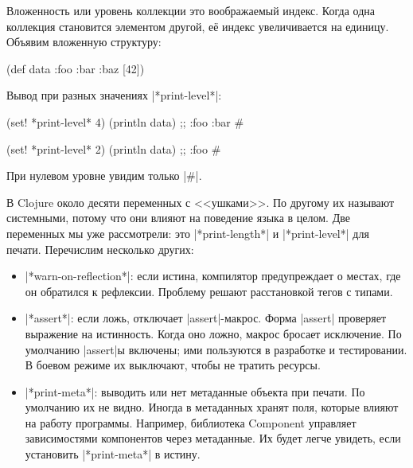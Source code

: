 Вложенность или уровень коллекции это воображаемый индекс. Когда одна коллекция
становится элементом другой, е\"{е} индекс увеличивается на единицу. Объявим
вложенную структуру:

\begin{english}
  \begin{clojure}
(def data {:foo {:bar {:baz [42]}}})
  \end{clojure}
\end{english}

\noindent
Вывод при разных значениях \spverb|*print-level*|:

\begin{english}
  \begin{clojure}
(set! *print-level* 4)
(println data)
;; {:foo {:bar #}}

(set! *print-level* 2)
(println data)
;; {:foo #}
  \end{clojure}
\end{english}

\noindent
При нулевом уровне увидим только \spverb|#|.


В Clojure около десяти переменных с <<ушками>>. По другому их называют
системными, потому что они влияют на поведение языка в целом. Две переменных мы
уже рассмотрели: это \spverb|*print-length*| и \spverb|*print-level*| для
печати. Перечислим несколько других:

\begin{itemize}


\item
  \spverb|*warn-on-reflection*|: если истина, компилятор предупреждает о местах,
  где он обратился к рефлексии. Проблему решают расстановкой тегов с типами.


\item
  \spverb|*assert*|: если ложь, отключает \spverb|assert|-макрос. Форма
  \spverb|assert| проверяет выражение на истинность. Когда оно ложно, макрос
  бросает исключение.  По умолчанию \spverb|assert|ы включены; ими пользуются в
  разработке и тестировании. В боевом режиме их выключают, чтобы не тратить
  ресурсы.


\item
  \spverb|*print-meta*|: выводить или нет метаданные объекта при печати. По
  умолчанию их не видно. Иногда в метаданных хранят поля, которые влияют на
  работу программы. Например, библиотека Component управляет зависимостями
  компонентов через метаданные. Их будет легче увидеть, если установить
  \spverb|*print-meta*| в истину.

\end{itemize}

